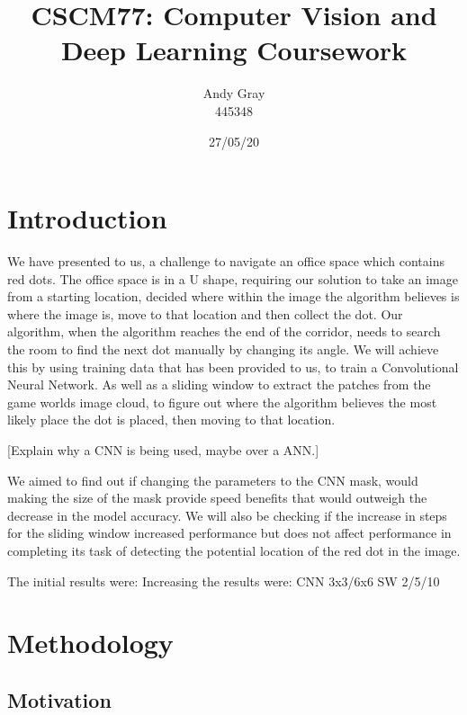 \documentclass[a4paper,10pt]{article}
\begin{document}
\title{\textbf{CSCM77: Computer Vision and Deep Learning Coursework}}
\date{27/05/20}
\author{Andy Gray\\445348}

\maketitle

\thispagestyle{empty}
\newpage
{}

\section{Introduction}

\small We have presented to us, a challenge to navigate an office space which contains red dots. The office space is in a U shape, requiring our solution to take an image from a starting location, decided where within the image the algorithm believes is where the image is, move to that location and then collect the dot. Our algorithm, when the algorithm reaches the end of the corridor, needs to search the room to find the next dot manually by changing its angle. We will achieve this by using training data that has been provided to us, to train a Convolutional Neural Network. As well as a sliding window to extract the patches from the game worlds image cloud, to figure out where the algorithm believes the most likely place the dot is placed, then moving to that location.

[Explain why a CNN is being used, maybe over a ANN.]

We aimed to find out if changing the parameters to the CNN mask, would making the size of the mask provide speed benefits that would outweigh the decrease in the model accuracy. We will also be checking if the increase in steps for the sliding window increased performance but does not affect performance in completing its task of detecting the potential location of the red dot in the image.

The initial results were:
Increasing the results were: CNN 3x3/6x6   SW 2/5/10

\section{Methodology}

\subsection{Motivation}
\end{document}
